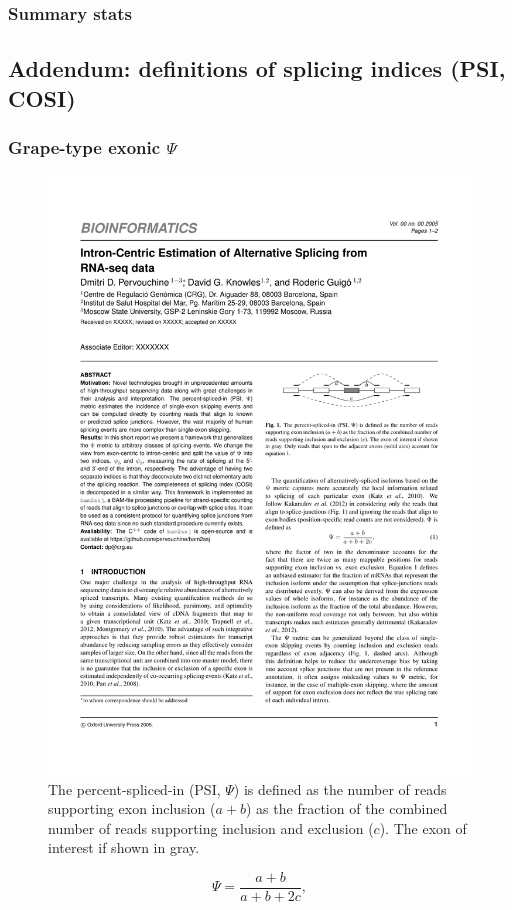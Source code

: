 \documentclass{article}
\begin{document}
\subsubsection{Summary stats}


\clearpage


\subsection{Addendum: definitions of splicing indices (PSI, COSI)}

\subsubsection{Grape-type exonic $\Psi$}
\begin{figure}[h!]
\begin{center}
\includegraphics{Latex/psi_def_figure1.pdf}
\caption[Grape-type exonic $\Psi$]{The percent-spliced-in (PSI, $\Psi$) is defined as the number of reads supporting exon inclusion
($a+b$) as the fraction of the combined number of reads supporting inclusion and exclusion ($c$).
The exon of interest if shown in gray.}
\end{center}
\end{figure}
$$\Psi=\frac{a+b}{a+b+2c},\label{eq::psi::eq01}$$
\end{document}
